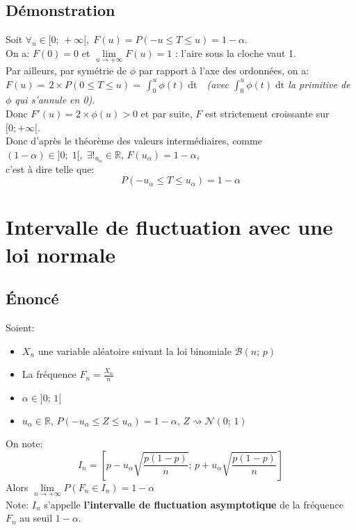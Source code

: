 \documentclass[12px]{article}
\begin{document}
	\subsection{Démonstration}
	Soit $\forall_u\in [0; \, +\infty[,\; F(u) = P(-u\leq T\leq u) = 1-\alpha$.\\
	On a: $F(0)=0$ et $\lim\limits_{u\rightarrow +\infty}F(u)=1$ : l'aire sous la cloche vaut 1.\\
	Par ailleurs, par symétrie de $\phi$ par rapport à l'axe des ordonnées, on a:\\
	$F(u) =\, 2\times P(0\leq T\leq u) =\, \int_{0}^{u}\phi (t)\; \mathrm{dt}$\ \  \emph{(avec $\int_{0}^{u}\phi (t)\; \mathrm{dt}$ la primitive de $\phi$ qui s'annule en 0)}.\\
	Donc $F'(u) = 2\times \phi (u) >0$ et par suite, $F$ est strictement croissante sur $[0; +\infty[$.\\
	Donc d'après le théorème des valeurs intermédiaires, comme $(1-\alpha)\in ]0;\; 1[,\; \exists !_{u_\alpha}\in\mathbb{R},\, F(u_\alpha) = 1-\alpha$,\\
	c'est à dire telle que:
	\begin{displaymath}
		P(-u_\alpha\leq T \leq u_\alpha) = 1-\alpha
	\end{displaymath}
	
	\section{Intervalle de fluctuation avec une loi normale}
	
	\subsection{\'Enoncé}
	Soient:
	\begin{itemize}
		\item $X_n$ une variable aléatoire suivant la loi binomiale $\mathcal{B}(n;\, p)$
		\item La fréquence $F_n=\frac{X_n}{n}$
		\item $\alpha\in ]0;\, 1[$
		\item $u_\alpha\in\mathbb{R},\, P(-u_\alpha\leq Z\leq u_\alpha)=1-\alpha,\, Z\rightsquigarrow \mathcal{N}(0;\, 1)$
	\end{itemize}
	On note:
	\begin{displaymath}
		I_n = \left[  p-u_\alpha\sqrt{\frac{p(1-p)}{n}} ;\, p+u_\alpha\sqrt{\frac{p(1-p)}{n}} \right]
	\end{displaymath}
	Alors $\lim\limits_{n\rightarrow +\infty}P(F_n\in I_n)=1-\alpha$\\
	Note: $I_n$ s'appelle \textbf{l'intervalle de fluctuation asymptotique} de la fréquence $F_n$ au seuil $1-\alpha $.
	
\end{document}
